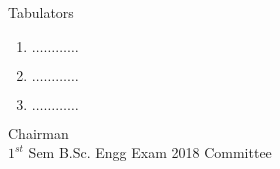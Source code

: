 \documentclass[12pt]{article}
\begin{document}
            \begin{table}[hb]
            	\centering
            \begin{minipage}[b]{0.5\linewidth} %
            {\centering Tabulators }
            \begin{enumerate}
                \item  \hspace*{1ex} $\ldots \ldots \ldots \ldots$  
                \item  \hspace*{1ex} $\ldots \ldots \ldots \ldots$  
                \item  \hspace*{1ex} $\ldots \ldots \ldots \ldots$  
            \end{enumerate} 

            \end{minipage}
            \hspace*{1.2cm}
            \begin{minipage}[b]{0.4\linewidth} \centering
            Chairman  \hspace*{1ex} \\
           $1^{st}$ Sem B.Sc. Engg Exam 2018 Committee
            \end{minipage}
            \end{table}
            \clearpage
            
\end{document}
